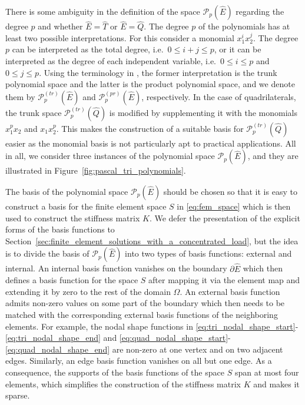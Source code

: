 \documentclass[english, 12pt, a4paper, sci, utf8, a-2b, online]{aaltothesis}
\theoremstyle{definition}
\theoremstyle{plain}
\numberwithin{equation}{section}
\begin{document}
There is some ambiguity in the definition of the space 
$\mathcal{P}_p(\widehat{E})$ regarding the degree $p$ and whether
$\widehat{E} = \widehat{T}$ or $\widehat{E} = \widehat{Q}$.
The degree $p$ of the polynomials has at least two possible interpretations.
For this consider a monomial $x_1^i x_2^j$.
The degree $p$ can be interpreted as the total degree,
i.e.\ $0 \leq i + j \leq p$,
or it can be interpreted as the degree of each independent variable,
i.e.\ $0 \leq i \leq p$ and $0 \leq j \leq p$.
Using the terminology in \cite{szabobabuska2011},
the former interpretation is the trunk polynomial space
and the latter is the product polynomial space, and we denote them by
$\mathcal{P}_p^{(tr)}(\widehat{E})$ and
$\mathcal{P}_p^{(pr)}(\widehat{E})$, respectively.
In the case of quadrilaterals, the trunk space $\mathcal{P}_p^{(tr)}(\widehat{Q})$
is modified by supplementing it with the monomials $x_1^p x_2$ and $x_1 x_2^p$.
This makes the construction of a suitable basis
for $\mathcal{P}_p^{(tr)}(\widehat{Q})$ easier as the monomial basis
is not particularly apt to practical applications.
All in all, we consider three instances of the polynomial space
$\mathcal{P}_p(\widehat{E})$, and they are illustrated in
Figure~\ref{fig:pascal_tri_polynomials}.

The basis of the polynomial space $\mathcal{P}_p(\widehat{E})$
should be chosen so that it is easy to construct a basis for the
finite element space $S$ in \eqref{eq:fem_space} which is then used to construct
the stiffness matrix $K$. We defer the presentation of the explicit
forms of the basis functions to
Section~\ref{sec:finite_element_solutions_with_a_concentrated_load},
but the idea is to divide the basis of $\mathcal{P}_p(\widehat{E})$
into two types of basis functions: external and internal.
An internal basis function vanishes on the boundary $\partial \widehat{E}$
which then defines a basis function for the space $S$
after mapping it via the element map and extending it by zero to the rest
of the domain $\Omega$.
An external basis function admits non-zero values on some part of the boundary
which then needs to be matched with the corresponding
external basis functions of the neighboring elements.
For example, the nodal shape functions in
\eqref{eq:tri_nodal_shape_start}-\eqref{eq:tri_nodal_shape_end}
and \eqref{eq:quad_nodal_shape_start}-\eqref{eq:quad_nodal_shape_end}
are non-zero at one vertex and on two adjacent edges. Similarly,
an edge basis function vanishes on all but one edge.
As a consequence, the supports of the basis functions of the space
$S$ span at most four elements, which simplifies the construction
of the stiffness matrix $K$ and makes it sparse.
\end{document}
